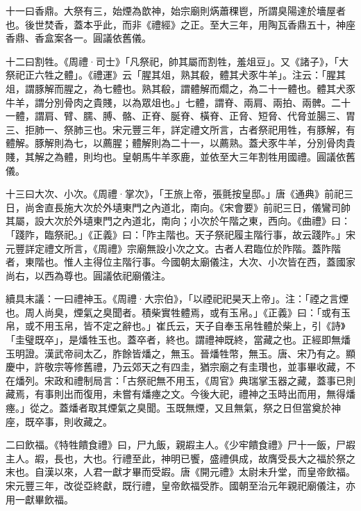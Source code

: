 \begin{pinyinscope}
 十一曰香鼎。大祭有三，始煙為歆神，始宗廟則焫蕭稞鬯，所謂臭陽達於墻屋者也。後世焚香，蓋本乎此，而非《禮經》之正。至大三年，用陶瓦香鼎五十，神座香鼎、香盒案各一。圓議依舊儀。



 十二曰割牲。《周禮·司士》「凡祭祀，帥其屬而割牲，羞俎豆」。又《諸子》，「大祭祀正六牲之體」。《禮運》云「腥其俎，熟其殽，體其犬豕牛羊」。注云：「腥其俎，謂豚解而腥之，為七體也。熟其殽，謂體解而爓之，為二十一體也。體其犬豕牛羊，謂分別骨肉之貴賤，以為眾俎也。」七體，謂脊、兩肩、兩拍、兩髀。二十一體，謂肩、臂、臑、膊、骼、正脊、脠脊、橫脊、正脅、短脅、代脅並腸三、胃三、拒肺一、祭肺三也。宋元豐三年，詳定禮文所言，古者祭祀用牲，有豚解，有體解。豚解則為七，以薦腥；體解則為二十一，以薦熟。蓋犬豕牛羊，分別骨肉貴賤，其解之為體，則均也。皇朝馬牛羊豕鹿，並依至大三年割牲用國禮。圓議依舊儀。



 十三曰大次、小次。《周禮·掌次》，「王旅上帝，張氈按皇邸。」唐《通典》前祀三日，尚舍直長施大次於外壝東門之內道北，南向。《宋會要》前祀三日，儀鸞司帥其屬，設大次於外壝東門之內道北，南向；小次於午階之東，西向。《曲禮》曰：「踐阼，臨祭祀。」《正義》曰：「阼主階也。天子祭祀履主階行事，故云踐阼。」宋元豐詳定禮文所言，《周禮》宗廟無設小次之文。古者人君臨位於阼階。蓋阼階者，東階也。惟人主得位主階行事。今國朝太廟儀注，大次、小次皆在西，蓋國家尚右，以西為尊也。圓議依祀廟儀注。



 續具末議：一曰禮神玉。《周禮·大宗伯》，「以禋祀祀昊天上帝」。注：「禋之言煙也。周人尚臭，煙氣之臭聞者。積柴實牲體焉，或有玉帛。」《正義》曰：「或有玉帛，或不用玉帛，皆不定之辭也。」崔氏云，天子自奉玉帛牲體於柴上，引《詩》「圭璧既卒」，是燔牲玉也。蓋卒者，終也。謂禮神既終，當藏之也。正經即無燔玉明證。漢武帝祠太乙，胙餘皆燔之，無玉。晉燔牲幣，無玉。唐、宋乃有之。顯慶中，許敬宗等修舊禮，乃云郊天之有四圭，猶宗廟之有圭瓚也，並事畢收藏，不在燔列。宋政和禮制局言：「古祭祀無不用玉，《周官》典瑞掌玉器之藏，蓋事已則藏焉，有事則出而復用，未嘗有燔瘞之文。今後大祀，禮神之玉時出而用，無得燔瘞。」從之。蓋燔者取其煙氣之臭聞。玉既無煙，又且無氣，祭之日但當奠於神座，既卒事，則收藏之。



 二曰飲福。《特牲饋食禮》曰，尸九飯，親嘏主人。《少牢饋食禮》尸十一飯，尸嘏主人。嘏，長也，大也。行禮至此，神明已饗，盛禮俱成，故膺受長大之福於祭之末也。自漢以來，人君一獻才畢而受嘏。唐《開元禮》太尉未升堂，而皇帝飲福。宋元豐三年，改從亞終獻，既行禮，皇帝飲福受胙。國朝至治元年親祀廟儀注，亦用一獻畢飲福。




\end{pinyinscope}
